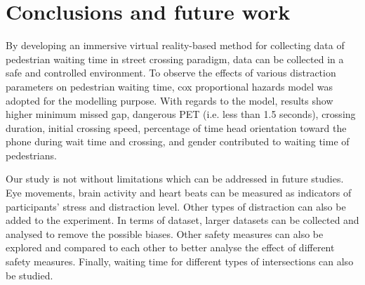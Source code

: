 \section{Conclusions and future work}
\label{S:D7}
By developing an immersive virtual reality-based method for collecting data of pedestrian waiting time in street crossing paradigm, data can be collected in a safe and controlled environment. To observe the effects of various distraction parameters on pedestrian waiting time, cox proportional hazards model was adopted for the modelling purpose. 
With regards to the model, results show higher minimum missed gap, dangerous PET (i.e. less than 1.5 seconds), crossing duration, initial crossing speed, percentage of time head orientation toward the phone during wait time and crossing, and gender contributed to waiting time of pedestrians. 

Our study is not without limitations which can be addressed in future studies. Eye movements, brain activity and heart beats can be measured as indicators of participants’ stress and distraction level. Other types of distraction can also be added to the experiment. In terms of dataset, larger datasets can be collected and analysed to remove the possible biases. Other safety measures can also be explored and compared to each other to better analyse the effect of different safety measures. Finally, waiting time for different types of intersections can also be studied.
